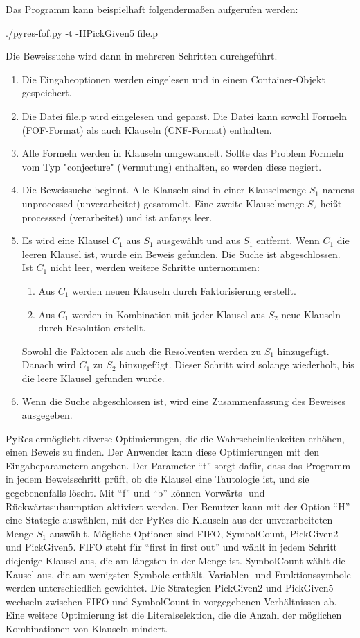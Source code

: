Das Programm kann beispielhaft folgendermaßen aufgerufen werden:

./pyres-fof.py -t -HPickGiven5 file.p

Die Beweissuche wird dann in mehreren Schritten durchgeführt. 
\begin{enumerate}
	\item Die Eingabeoptionen werden eingelesen und in einem Container-Objekt gespeichert.
	\item Die Datei file.p wird eingelesen und geparst. Die Datei kann sowohl Formeln (FOF-Format) als auch Klauseln (CNF-Format) enthalten.
	\item Alle Formeln werden in Klauseln umgewandelt. Sollte das Problem Formeln vom Typ "conjecture" (Vermutung) enthalten, so werden diese negiert.
	\item Die Beweissuche beginnt. Alle Klauseln sind in einer Klauselmenge $S_1$ namens unprocessed (unverarbeitet) gesammelt. Eine zweite Klauselmenge $S_2$ heißt processsed (verarbeitet) und ist anfangs leer. 
	\item Es wird eine Klausel $C_1$ aus $S_1$ ausgewählt und aus $S_1$ entfernt. Wenn $C_1$ die leeren Klausel ist, wurde ein Beweis gefunden. Die Suche ist abgeschlossen. Ist $C_1$ nicht leer, werden weitere Schritte unternommen:
	\begin{enumerate}
		\item Aus $C_1$ werden neuen Klauseln durch Faktorisierung erstellt.
		\item Aus $C_1$ werden in Kombination mit jeder Klausel aus $S_2$ neue Klauseln durch Resolution erstellt.
	\end{enumerate}
	Sowohl die Faktoren als auch die Resolventen werden zu $S_1$ hinzugefügt. Danach wird $C_1$ zu $S_2$ hinzugefügt. Dieser Schritt wird solange wiederholt, bis die leere Klausel gefunden wurde.
	\item Wenn die Suche abgeschlossen ist, wird eine Zusammenfassung des Beweises ausgegeben.
\end{enumerate}
PyRes ermöglicht diverse Optimierungen, die die Wahrscheinlichkeiten erhöhen, einen Beweis zu finden.
Der Anwender kann diese Optimierungen mit den Eingabeparametern angeben. Der Parameter "`t"' sorgt dafür, dass das Programm in jedem Beweisschritt prüft, ob die Klausel eine Tautologie ist, und sie gegebenenfalls löscht. Mit "`f"' und "`b"' können Vorwärts- und Rückwärtssubsumption aktiviert werden.
Der Benutzer kann mit der Option "`H"' eine Stategie auswählen, mit der PyRes die Klauseln aus der unverarbeiteten Menge $S_1$ auswählt. Mögliche Optionen sind FIFO, SymbolCount, PickGiven2 und PickGiven5. FIFO steht für "`first in first out"' und wählt in jedem Schritt diejenige Klausel aus, die am längsten in der Menge ist. SymbolCount wählt die Kausel aus, die am wenigsten Symbole enthält. Variablen- und Funktionssymbole werden unterschiedlich gewichtet. Die Strategien PickGiven2 und PickGiven5 wechseln zwischen FIFO und SymbolCount in vorgegebenen Verhältnissen ab. Eine weitere Optimierung ist die Literalselektion, die die Anzahl der möglichen Kombinationen von Klauseln mindert.